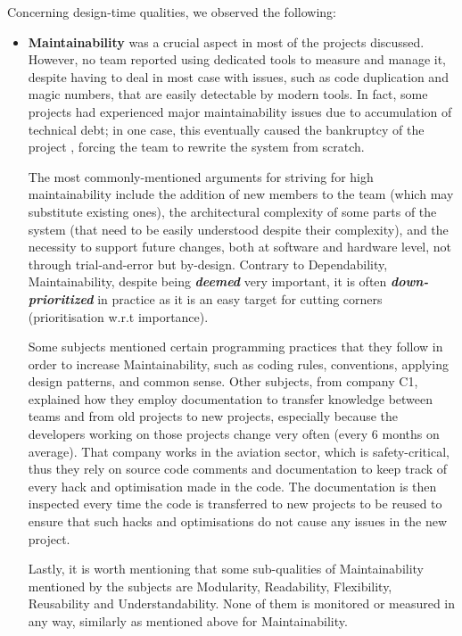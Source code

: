 Concerning design-time qualities, we observed the following:
\begin{itemize}
    \item \textbf{Maintainability} was a crucial aspect in most of the projects discussed.
    However, no team reported using dedicated tools to measure and manage it, despite having to deal in most case with issues, such as code duplication and magic numbers, that are easily detectable by modern tools.
    In fact, some projects had experienced major maintainability issues due to accumulation of technical debt; in one case, this eventually caused the bankruptcy of the project \cite{Ampatzoglou2015}, forcing the team to rewrite the system from scratch.
 
    The most commonly-mentioned arguments for striving for high maintainability include the addition of new members to the team (which may substitute existing ones), the architectural complexity of some parts of the system (that need to be easily understood despite their complexity), and the necessity to support future changes, both at software and hardware level, not through trial-and-error but by-design. 
    Contrary to Dependability, Maintainability, despite being \textbf{\textit{deemed}} very important, it is often \textbf{\textit{down-prioritized}} in practice as it is an easy target for cutting corners (prioritisation w.r.t importance).
    
    Some subjects mentioned certain programming practices that they follow in order to increase Maintainability, such as coding rules, conventions, applying design patterns, and common sense.
    Other subjects, from company C1, explained how they employ documentation to transfer knowledge between teams and from old projects to new projects, especially because the developers working on those projects change very often (every 6 months on average). 
    That company works in the aviation sector, which is safety-critical, thus they rely on source code comments and documentation to keep track of every hack and optimisation made in the code. The documentation is then inspected every time the code is transferred to new projects to be reused to ensure that such hacks and optimisations do not cause any issues in the new project.
        
    Lastly, it is worth mentioning that some sub-qualities of Maintainability mentioned by the subjects are Modularity, Readability, Flexibility, Reusability and Understandability. None of them is monitored or measured in any way, similarly as mentioned above for Maintainability. 
    

\end{itemize}
